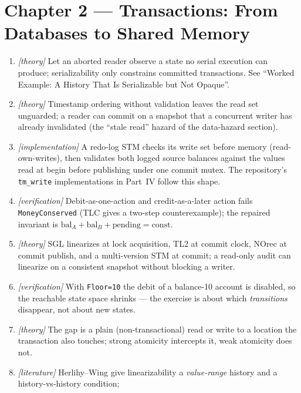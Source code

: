 \section*{Chapter 2 --- Transactions: From Databases to Shared Memory}

\begin{enumerate}
    \item \emph{[theory]} Let an aborted reader observe a state no serial
          execution can produce; serializability only constrains committed
          transactions.  See ``Worked Example: A History That Is
          Serializable but Not Opaque''.
    \item \emph{[theory]} Timestamp ordering without validation leaves the
          read set unguarded; a reader can commit on a snapshot that a
          concurrent writer has already invalidated (the ``stale read''
          hazard of the data-hazard section).
    \item \emph{[implementation]} A redo-log STM checks its write set
          before memory (read-own-writes), then validates both logged
          source balances against the values read at begin before
          publishing under one commit mutex.  The repository's
          \texttt{tm\_write} implementations in Part~IV follow this shape.
    \item \emph{[verification]} Debit-as-one-action and credit-as-a-later
          action fails \texttt{MoneyConserved} (TLC gives a two-step
          counterexample); the repaired invariant is
          $\mathrm{bal}_A+\mathrm{bal}_B+\mathrm{pending} = \mathrm{const}$.
    \item \emph{[theory]} SGL linearizes at lock acquisition, TL2 at commit
          clock, NOrec at commit publish, and a multi-version STM at
          commit; a read-only audit can linearize on a consistent snapshot
          without blocking a writer.
    \item \emph{[verification]} With \texttt{Floor=10} the debit of a
          balance-10 account is disabled, so the reachable state space
          shrinks --- the exercise is about which \emph{transitions}
          disappear, not about new states.
    \item \emph{[theory]} The gap is a plain (non-transactional) read or
          write to a location the transaction also touches; strong
          atomicity intercepts it, weak atomicity does not.
    \item \emph{[literature]} Herlihy--Wing give linearizability a
          \emph{value-range} history and a history-vs-history condition;

\end{enumerate}
